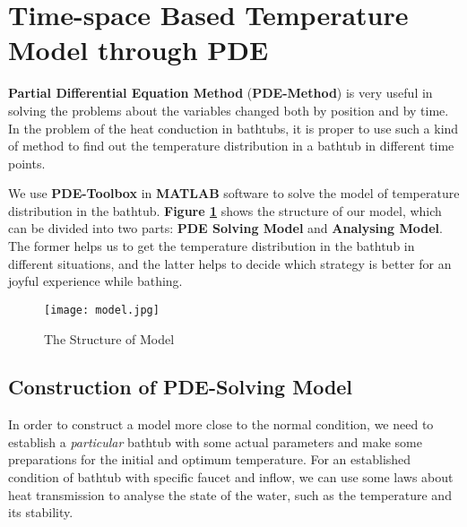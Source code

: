\documentclass{HZNUMCM}
\begin{document}
\section{Time-space Based Temperature Model through PDE}
\textbf{Partial Differential Equation Method} (\textbf{PDE-Method}) \cite{2011_Ozturk_1532} is very useful in
solving the problems about the variables changed both by position and by time. In the problem of the
heat conduction in bathtubs, it is proper to use such a kind of method to find out the temperature
distribution in a bathtub in different time points.

We use \textbf{PDE-Toolbox} in \textbf{MATLAB} software to solve the model of temperature
distribution in the bathtub. \textbf{Figure \ref{jj}} shows the structure of our model, which can be
divided into two parts: \textbf{PDE Solving Model} and \textbf{Analysing Model}. The former helps us
to get the temperature distribution in the bathtub in different situations, and the latter helps to
decide which strategy is better for an joyful experience while bathing.
\begin{figure}[!htbp]
    \small
    \centering
    \texttt{[image: model.jpg]}
    \caption{The Structure of Model}\label{jj}
\end{figure}

\subsection{Construction of PDE-Solving Model}
In order to construct a model more close to the normal condition, we need to establish a
\emph{particular} bathtub with some actual parameters and make some preparations for the initial and
optimum temperature. For an established condition of bathtub with specific faucet and inflow, we can
use some laws about heat transmission to analyse the state of the water, such as the temperature and
its stability.
\end{document}
